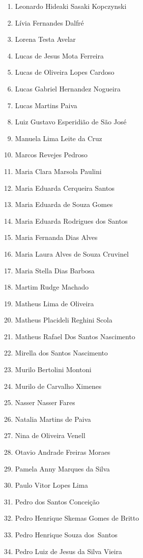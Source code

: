 \documentclass[
  letterpaper,
  DIV=11,
  numbers=noendperiod]{scrreprt}
\begin{document}
\begin{enumerate}
\item
  Leonardo Hideaki Sasaki Kopczynski
\item
  Lívia Fernandes Dalfré
\item
  Lorena Testa Avelar
\item
  Lucas de Jesus Mota Ferreira
\item
  Lucas de Oliveira Lopes Cardoso
\item
  Lucas Gabriel Hernandez Nogueira
\item
  Lucas Martins Paiva
\item
  Luiz Gustavo Esperidião de São José
\item
  Manuela Lima Leite da Cruz
\item
  Marcos Revejes Pedroso
\item
  Maria Clara Marsola Paulini
\item
  Maria Eduarda Cerqueira Santos
\item
  Maria Eduarda de Souza Gomes
\item
  Maria Eduarda Rodrigues dos Santos
\item
  ⁠Maria Fernanda Dias Alves
\item
  Maria Laura Alves de Souza Cruvinel
\item
  Maria Stella Dias Barbosa
\item
  Martim Rudge Machado
\item
  Matheus Lima de Oliveira
\item
  Matheus Placideli Reghini Scola
\item
  Matheus Rafael Dos Santos Nascimento
\item
  Mirella dos Santos Nascimento
\item
  Murilo Bertolini Montoni
\item
  Murilo de Carvalho Ximenes
\item
  Nasser Nasser Fares
\item
  Natalia Martins de Paiva
\item
  Nina de Oliveira Venell
\item
  Otavio Andrade Freiras Moraes
\item
  Pamela Anny Marques da Silva
\item
  Paulo Vitor Lopes Lima
\item
  Pedro dos Santos Conceição
\item
  Pedro Henrique Skemas Gomes de Britto
\item
  Pedro Henrique Souza dos~Santos
\item
  Pedro Luiz de Jesus da Silva Vieira

\end{enumerate}
\end{document}
